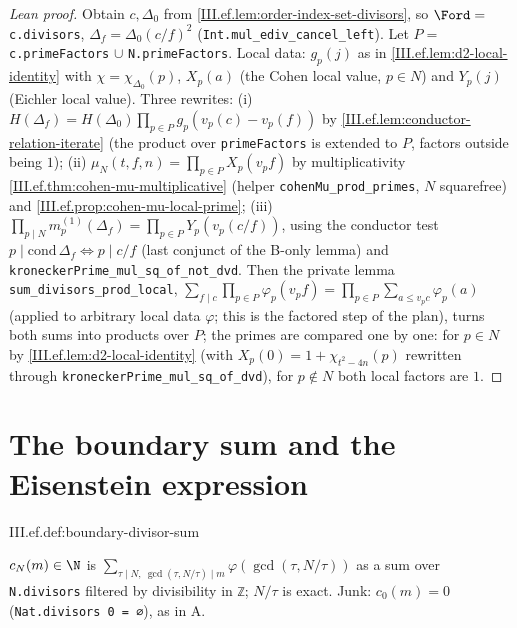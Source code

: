 \begin{proof}[Lean proof]
Obtain $c,\Delta_0$ from \cref{III.ef.lem:order-index-set-divisors}, so $\Ford=$ \texttt{c.divisors}, $\Delta_f=\Delta_0(c/f)^2$ (\texttt{Int.mul\_ediv\_cancel\_left}). Let $P=$ \texttt{c.primeFactors} $\cup$ \texttt{N.primeFactors}. Local data: $g_p(j)$ as in \cref{III.ef.lem:d2-local-identity} with $\chi=\chi_{\Delta_0}(p)$, $X_p(a)$ (the Cohen local value, $p\in N$) and $Y_p(j)$ (Eichler local value). Three rewrites: (i) $H(\Delta_f)=H(\Delta_0)\prod_{p\in P}g_p(v_p(c)-v_p(f))$ by \cref{III.ef.lem:conductor-relation-iterate} (the product over \texttt{primeFactors} is extended to $P$, factors outside being $1$); (ii) $\mu_N(t,f,n)=\prod_{p\in P}X_p(v_p f)$ by multiplicativity \cref{III.ef.thm:cohen-mu-multiplicative} (helper \texttt{cohenMu\_prod\_primes}, $N$ squarefree) and \cref{III.ef.prop:cohen-mu-local-prime}; (iii) $\prod_{p\mid N}m^{(1)}_p(\Delta_f)=\prod_{p\in P}Y_p(v_p(c/f))$, using the conductor test $p\mid\mathrm{cond}\,\Delta_f\iff p\mid c/f$ (last conjunct of the B-only lemma) and \texttt{kroneckerPrime\_mul\_sq\_of\_not\_dvd}. Then the private lemma \texttt{sum\_divisors\_prod\_local}, $\sum_{f\mid c}\prod_{p\in P}\varphi_p(v_p f)=\prod_{p\in P}\sum_{a\le v_p c}\varphi_p(a)$ (applied to arbitrary local data $\varphi$; this is the factored step of the plan), turns both sums into products over $P$; the primes are compared one by one: for $p\in N$ by \cref{III.ef.lem:d2-local-identity} (with $X_p(0)=1+\chi_{t^2-4n}(p)$ rewritten through \texttt{kroneckerPrime\_mul\_sq\_of\_dvd}), for $p\notin N$ both local factors are $1$.
\end{proof}

\section{The boundary sum and the Eisenstein expression}\label{sec:ef-boundary}

\begin{definition}
\end{definition}
\begin{tfformal}{III.ef.def:boundary-divisor-sum}
\begin{tffidelity}
$c_N(m)\in\N$ is $\sum_{\tau\mid N,\ \gcd(\tau,N/\tau)\mid m}\varphi(\gcd(\tau,N/\tau))$ as a sum over \texttt{N.divisors} filtered by divisibility in \texttt{ℤ}; $N/\tau$ is exact. Junk: $c_0(m)=0$ (\texttt{Nat.divisors 0 = ∅}), as in A.
\end{tffidelity}
\end{tfformal}

